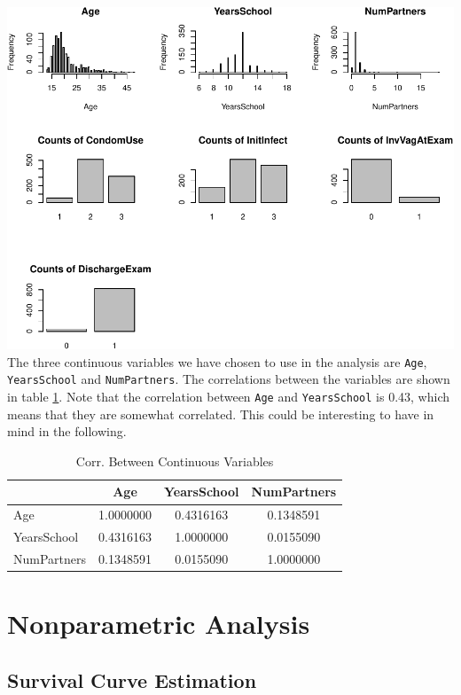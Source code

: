 \documentclass[
]{article}
\begin{document}
\includegraphics{practical_files/figure-latex/EDA-plots-1.pdf}
The three continuous variables we have chosen to use in the analysis are \texttt{Age}, \texttt{YearsSchool} and \texttt{NumPartners}. The correlations between the variables are shown in table \ref{tab:correlations}. Note that the correlation between \texttt{Age} and \texttt{YearsSchool} is 0.43, which means that they are somewhat correlated. This could be interesting to have in mind in the following.

\begin{table}

\caption{\label{tab:correlations}Corr. Between Continuous Variables}
\centering
\begin{tabular}[t]{l|c|c|c}
\hline
  & Age & YearsSchool & NumPartners\\
\hline
Age & 1.0000000 & 0.4316163 & 0.1348591\\
\hline
YearsSchool & 0.4316163 & 1.0000000 & 0.0155090\\
\hline
NumPartners & 0.1348591 & 0.0155090 & 1.0000000\\
\hline
\end{tabular}
\end{table}

\hypertarget{nonparametric-analysis}{%
\section{Nonparametric Analysis}\label{nonparametric-analysis}}

\hypertarget{survival-curve-estimation}{%
\subsection{Survival Curve Estimation}\label{survival-curve-estimation}}
\end{document}

